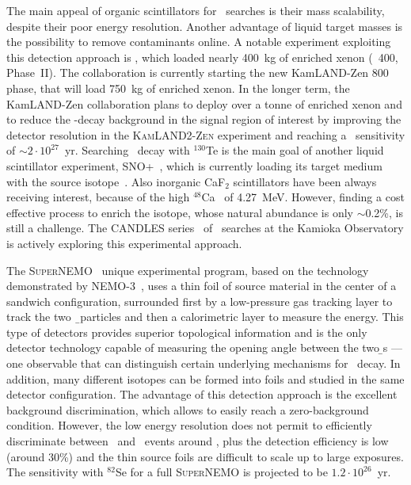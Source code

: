 \begin{description}[wide]
  \item[Scintillators] The main appeal of organic scintillators for \onbb\ searches is
    their mass scalability, despite their poor energy resolution.  Another advantage of
    liquid target masses is the possibility to remove contaminants online. A notable
    experiment exploiting this detection approach is \kamlandzen, which loaded nearly
    400~kg of enriched xenon (\kamlandzen\ 400, Phase~II). The collaboration is currently
    starting the new KamLAND-Zen 800 phase, that will load 750~kg of enriched xenon. In
    the longer term, the KamLAND-Zen collaboration plans to deploy over a tonne of
    enriched xenon and to reduce the \nnbb-decay background in the signal region of
    interest by improving the detector resolution in the \textsc{KamLAND2-Zen} experiment and
    reaching a \thalfzero\ sensitivity of ${\sim}2 \cdot 10^{27}$~yr. Searching \onbb\
    decay with $^{130}$Te is the main goal of another liquid scintillator experiment,
    SNO+~\cite{Andringa2015}, which is currently loading its target medium with the source
    isotope~\cite{Paton2019}. Also inorganic CaF$_2$ scintillators have been always
    receiving interest, because of the high $^{48}$Ca \qbb\ of 4.27~MeV. However, finding
    a cost effective process to enrich the isotope, whose natural abundance is only
    $\sim$0.2\%, is still a challenge. The CANDLES series~\cite{Umehara2015} of \onbb\
    searches at the Kamioka Observatory is actively exploring this experimental approach.

  \item[Tracking Calorimeters] The \textsc{SuperNEMO}~\cite{Arnold2010} unique
    experimental program, based on the technology demonstrated by
    NEMO-3~\cite{Arnold2004}, uses a thin foil of source material in the center of a
    sandwich configuration, surrounded first by a low-pressure gas tracking layer to track
    the two \b\ particles and then a calorimetric layer to measure the energy. This type
    of detectors provides superior topological information and is the only detector
    technology capable of measuring the opening angle between the two {\b}s --- one
    observable that can distinguish certain underlying mechanisms for \onbb\ decay. In
    addition, many different isotopes can be formed into foils and studied in the same
    detector configuration. The advantage of this detection approach is the excellent
    background discrimination, which allows to easily reach a zero-background condition.
    However, the low energy resolution does not permit to efficiently discriminate between
    \nnbb\ and \onbb\ events around \qbb, plus the detection efficiency is low (around
    30\%) and the thin source foils are difficult to scale up to large exposures. The
    sensitivity with $^{82}$Se for a full \textsc{SuperNEMO} is projected to be $1.2 \cdot
    10^{26}$~yr.

\end{description}

